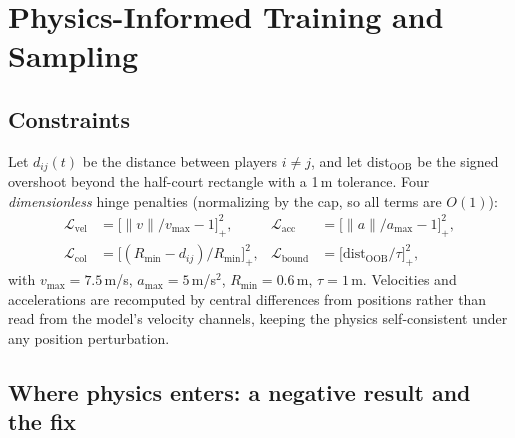 \documentclass[11pt]{article}
\newcommand{\loss}{\mathcal{L}}
\begin{document}
\section{Physics-Informed Training and Sampling}
\label{sec:physics}

\subsection{Constraints}
Let $d_{ij}(t)$ be the distance between players $i \ne j$, and let
$\text{dist}_{\text{OOB}}$ be the signed overshoot beyond the half-court
rectangle with a 1\,m tolerance. Four \emph{dimensionless} hinge penalties
(normalizing by the cap, so all terms are $O(1)$):
\begin{equation}
\begin{aligned}
\loss_{\text{vel}} &= \big[\|v\| / v_{\max} - 1\big]_+^2, &
\loss_{\text{acc}} &= \big[\|a\| / a_{\max} - 1\big]_+^2, \\
\loss_{\text{col}} &= \big[(R_{\min} - d_{ij}) / R_{\min}\big]_+^2, &
\loss_{\text{bound}} &= \big[\text{dist}_{\text{OOB}} / \tau \big]_+^2,
\end{aligned}
\label{eq:physics}
\end{equation}
with $v_{\max} = 7.5$\,m/s, $a_{\max} = 5$\,m/s$^2$, $R_{\min} = 0.6$\,m,
$\tau = 1$\,m. Velocities and accelerations are recomputed by central
differences from positions rather than read from the model's velocity
channels, keeping the physics self-consistent under any position
perturbation.

\subsection{Where physics enters: a negative result and the fix}
\label{sec:where}
\end{document}
